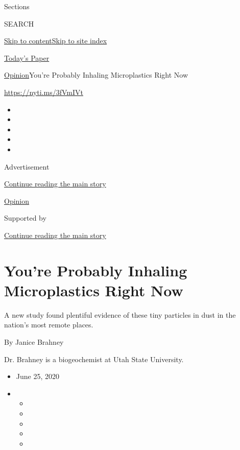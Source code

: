 Sections

SEARCH

\protect\hyperlink{site-content}{Skip to
content}\protect\hyperlink{site-index}{Skip to site index}

\href{https://myaccount.nytimes.com/auth/login?response_type=cookie\&client_id=vi}{}

\href{https://www.nytimes.com/section/todayspaper}{Today's Paper}

\href{/section/opinion}{Opinion}\textbar{}You're Probably Inhaling
Microplastics Right Now

\href{https://nyti.ms/3fVmIVt}{https://nyti.ms/3fVmIVt}

\begin{itemize}
\item
\item
\item
\item
\item
\end{itemize}

Advertisement

\protect\hyperlink{after-top}{Continue reading the main story}

\href{/section/opinion}{Opinion}

Supported by

\protect\hyperlink{after-sponsor}{Continue reading the main story}

\hypertarget{youre-probably-inhaling-microplastics-right-now}{%
\section{You're Probably Inhaling Microplastics Right
Now}\label{youre-probably-inhaling-microplastics-right-now}}

A new study found plentiful evidence of these tiny particles in dust in
the nation's most remote places.

By Janice Brahney

Dr. Brahney is a biogeochemist at Utah State University.

\begin{itemize}
\item
  June 25, 2020
\item
  \begin{itemize}
  \item
  \item
  \item
  \item
  \item
  \end{itemize}
\end{itemize}


